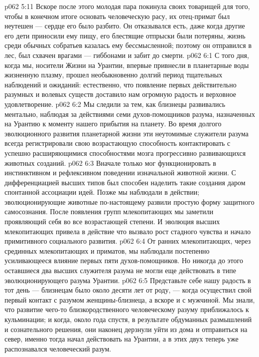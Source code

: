 \vs p062 5:11 Вскоре после этого молодая пара покинула своих товарищей для того, чтобы в конечном итоге основать человеческую расу, их отец\hyp{}примат был неутешен --- сердце его было разбито. Он отказывался есть, даже когда другие его дети приносили ему пищу, его блестящие отпрыски были потеряны, жизнь среди обычных собратьев казалась ему бессмысленной; поэтому он отправился в лес, был схвачен врагами --- гиббонами и забит до смерти.
\vs p062 6:1 С того дня, когда мы, носители Жизни на Урантии, впервые привнесли в планетарные воды жизненную плазму, прошел необыкновенно долгий период тщательных наблюдений и ожиданий: естественно, что появление первых действительно разумных и волевых существ доставило нам огромную радость и верховное удовлетворение.
\vs p062 6:2 Мы следили за тем, как близнецы развивались ментально, наблюдая за действиями семи духов\hyp{}помощников разума, назначенных на Урантию к моменту нашего прибытия на планету. Во время долгого эволюционного развития планетарной жизни эти неутомимые служители разума всегда регистрировали свою возрастающую способность контактировать с успешно расширяющимися способностями мозга прогрессивно развивающихся животных созданий.
\vs p062 6:3 Вначале только  мог функционировать в инстинктивном и рефлексивном поведении изначальной животной жизни. С дифференциацией высших типов  был способен наделить такие создания даром спонтанной ассоциации идей. Позже мы наблюдали  в действии; эволюционирующие животные по\hyp{}настоящему развили простую форму защитного самосознания. После появления групп млекопитающих мы заметили  проявляющий себя во все возрастающей степени. И эволюция высших млекопитающих привела в действие  что вызвало рост стадного чувства и начало примитивного социального развития.
\vs p062 6:4 От ранних млекопитающих, через срединных млекопитающих и приматов, мы наблюдали постепенно усиливающееся влияние первых пяти духов\hyp{}помощников. Но никогда до этого оставшиеся два высших служителя разума не могли еще действовать в типе эволюционирующего разума Урантии.
\vs p062 6:5 Представьте себе нашу радость в тот день --- близнецам было около десяти лет от роду, --- когда  осуществил свой первый контакт с разумом женщины\hyp{}близнеца, а вскоре и с мужчиной. Мы знали, что развитие чего\hyp{}то близкородственного человеческому разуму приближалось к кульминации; и когда, около года спустя, в результате обдуманных размышлений и сознательного решения, они наконец дерзнули уйти из дома и отправиться на север, именно тогда  начал действовать на Урантии, а в этих двух теперь уже распознавался человеческий разум.

